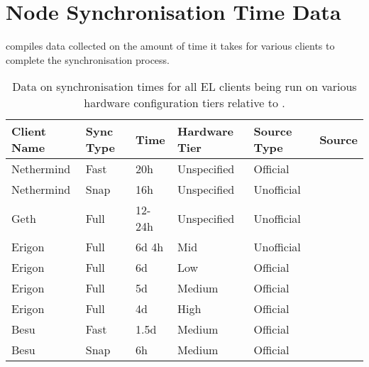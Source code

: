 \chapter{Node Synchronisation Time Data}

 compiles data collected on the amount of time it takes for various clients to complete the synchronisation process. 

\begin{table}[htb!]
\centering
\begin{tabular}{|l|l|l|l|l|l|}
\hline
\textbf{Client Name} & \textbf{Sync Type} & \textbf{Time} & \textbf{Hardware Tier} & \textbf{Source Type} & \textbf{Source} \\ \hline
Nethermind & Fast & 20h    & Unspecified & Official   & \cite{2022SyncDocs} \\ \hline
Nethermind & Snap & 16h    & Unspecified & Unofficial & \cite{3Ethstakerc} \\ \hline
Geth       & Full & 12-24h & Unspecified & Unofficial & \cite{3Ethstakerb} \\ \hline
Erigon     & Full & 6d 4h  & Mid         & Unofficial & \cite{3Ethstaker}  \\ \hline
Erigon     & Full & 6d     & Low         & Official   & \cite{2022Ledgerwatch/erigon:Frontier}  \\ \hline
Erigon     & Full & 5d     & Medium      & Official   & \cite{2022Ledgerwatch/erigon:Frontier}  \\ \hline
Erigon     & Full & 4d     & High        & Official   &\cite{2022Ledgerwatch/erigon:Frontier} \\ \hline
Besu       & Fast & 1.5d   & Medium      & Official   & \cite{SyncBesu} \\ \hline
Besu       & Snap & 6h     & Medium      & Official   & \cite{SyncBesu} \\ \hline
\end{tabular}
\caption{Data on synchronisation times for all EL clients being run on various hardware configuration tiers relative to  .}
\label{Table:ELRunTime}
\end{table}
